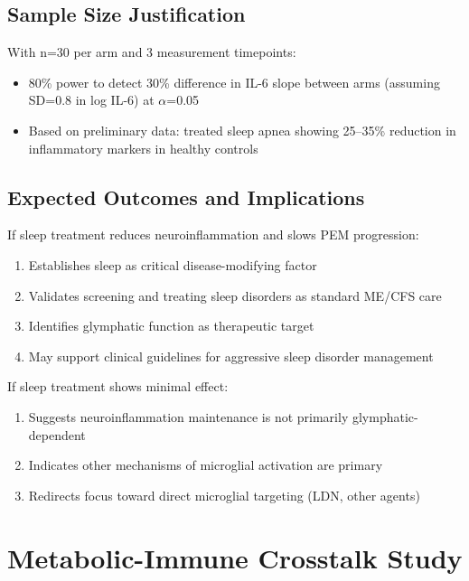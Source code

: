\subsection{Sample Size Justification}

With n=30 per arm and 3 measurement timepoints:
\begin{itemize}
    \item 80\% power to detect 30\% difference in IL-6 slope between arms (assuming SD=0.8 in log IL-6) at $\alpha$=0.05
    \item Based on preliminary data: treated sleep apnea showing 25--35\% reduction in inflammatory markers in healthy controls
\end{itemize}

\subsection{Expected Outcomes and Implications}

If sleep treatment reduces neuroinflammation and slows PEM progression:
\begin{enumerate}
    \item Establishes sleep as critical disease-modifying factor
    \item Validates screening and treating sleep disorders as standard ME/CFS care
    \item Identifies glymphatic function as therapeutic target
    \item May support clinical guidelines for aggressive sleep disorder management
\end{enumerate}

If sleep treatment shows minimal effect:
\begin{enumerate}
    \item Suggests neuroinflammation maintenance is not primarily glymphatic-dependent
    \item Indicates other mechanisms of microglial activation are primary
    \item Redirects focus toward direct microglial targeting (LDN, other agents)
\end{enumerate}

\section{Metabolic-Immune Crosstalk Study}
\label{sec:metabolic-immune-crosstalk}

